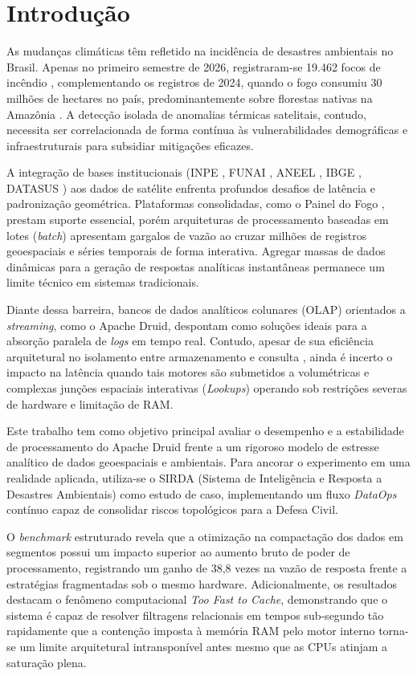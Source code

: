 \section{Introdução}

As mudanças climáticas têm refletido na incidência de desastres ambientais no Brasil. Apenas no primeiro semestre de 2026, registraram-se 19.462 focos de incêndio \cite{poder360_2026}, complementando os registros de 2024, quando o fogo consumiu 30 milhões de hectares no país, predominantemente sobre florestas nativas na Amazônia \cite{g1_mapbiomas_2025}. A detecção isolada de anomalias térmicas satelitais, contudo, necessita ser correlacionada de forma contínua às vulnerabilidades demográficas e infraestruturais para subsidiar mitigações eficazes.

A integração de bases institucionais (INPE \cite{inpe_bdqueimadas_2026}, FUNAI \cite{funai_terras_2026}, ANEEL \cite{aneel_sigel_2026}, IBGE \cite{ibge_malha_2022}, DATASUS \cite{datasus_cnes_2026}) aos dados de satélite enfrenta profundos desafios de latência e padronização geométrica. Plataformas consolidadas, como o Painel do Fogo \cite{censipam_painel_2026}, prestam suporte essencial, porém arquiteturas de processamento baseadas em lotes (\textit{batch}) apresentam gargalos de vazão ao cruzar milhões de registros geoespaciais e séries temporais de forma interativa. Agregar massas de dados dinâmicas para a geração de respostas analíticas instantâneas permanece um limite técnico em sistemas tradicionais.

Diante dessa barreira, bancos de dados analíticos colunares (OLAP) orientados a \textit{streaming}, como o Apache Druid, despontam como soluções ideais para a absorção paralela de \textit{logs} em tempo real. Contudo, apesar de sua eficiência arquitetural no isolamento entre armazenamento e consulta \cite{yang_druid_2014}, ainda é incerto o impacto na latência quando tais motores são submetidos a volumétricas e complexas junções espaciais interativas (\textit{Lookups}) operando sob restrições severas de hardware e limitação de RAM.

Este trabalho tem como objetivo principal avaliar o desempenho e a estabilidade de processamento do Apache Druid frente a um rigoroso modelo de estresse analítico de dados geoespaciais e ambientais. Para ancorar o experimento em uma realidade aplicada, utiliza-se o SIRDA (Sistema de Inteligência e Resposta a Desastres Ambientais) como estudo de caso, implementando um fluxo \textit{DataOps} contínuo \cite{ereth_dataops_2018} capaz de consolidar riscos topológicos para a Defesa Civil.

O \textit{benchmark} estruturado revela que a otimização na compactação dos dados em segmentos possui um impacto superior ao aumento bruto de poder de processamento, registrando um ganho de 38,8 vezes na vazão de resposta frente a estratégias fragmentadas sob o mesmo hardware. Adicionalmente, os resultados destacam o fenômeno computacional \textit{Too Fast to Cache}, demonstrando que o sistema é capaz de resolver filtragens relacionais em tempos sub-segundo tão rapidamente que a contenção imposta à memória RAM pelo motor interno torna-se um limite arquitetural intransponível antes mesmo que as CPUs atinjam a saturação plena.
